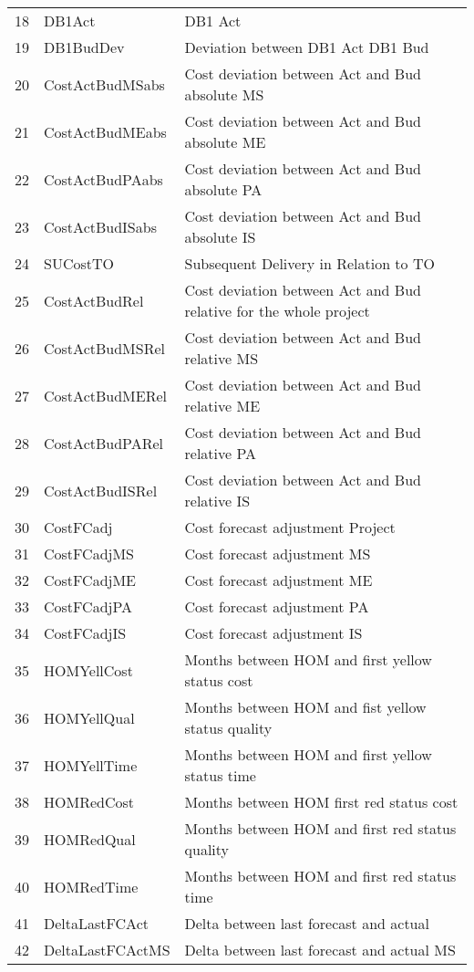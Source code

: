 \begin{longtable}[ht]{p{} p{}p{}}
18    & DB1Act & DB1 Act \\
19    & DB1BudDev & Deviation between DB1 Act DB1 Bud \\
20    & CostActBudMSabs & Cost deviation between Act and Bud absolute MS \\
21    & CostActBudMEabs & Cost deviation between Act and Bud absolute ME \\
22    & CostActBudPAabs & Cost deviation between Act and Bud absolute PA \\
23    & CostActBudISabs & Cost deviation between Act and Bud absolute IS \\
24    & SUCostTO & Subsequent Delivery in Relation to TO \\
25    & CostActBudRel & Cost deviation between Act and Bud relative for the whole project \\
26    & CostActBudMSRel & Cost deviation between Act and Bud relative MS \\
27    & CostActBudMERel & Cost deviation between Act and Bud relative ME\\
28    & CostActBudPARel & Cost deviation between Act and Bud relative PA \\
29    & CostActBudISRel & Cost deviation between Act and Bud relative IS \\
30    & CostFCadj & Cost forecast adjustment Project \\
31    & CostFCadjMS & Cost forecast adjustment MS \\
32    & CostFCadjME & Cost forecast adjustment ME \\
33    & CostFCadjPA & Cost forecast adjustment PA \\
34    & CostFCadjIS & Cost forecast adjustment IS \\
35    & HOMYellCost & Months between HOM and first yellow status cost \\
36    & HOMYellQual & Months between HOM and fist yellow status quality \\
37    & HOMYellTime & Months between HOM and first yellow status time \\
38    & HOMRedCost & Months between HOM first red status cost \\
39    & HOMRedQual & Months between HOM and first red status quality \\
40    & HOMRedTime & Months between HOM and first red status time \\
41    & DeltaLastFCAct & Delta between last forecast and actual  \\
42    & DeltaLastFCActMS & Delta between last forecast and actual MS \\

\end{longtable}
